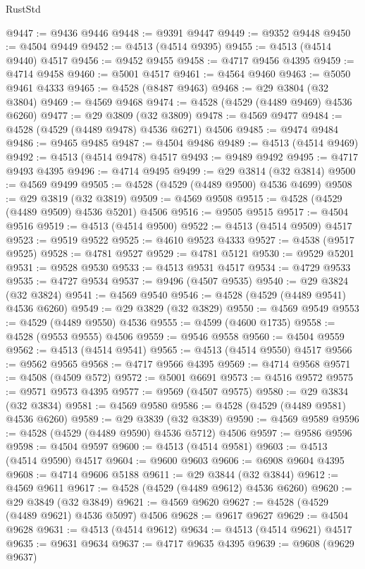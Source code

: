 \begin{lexlean}{RustStd}
\begin{coremodule}
@9447 := @9436 @9446
@9448 := @9391 @9447
@9449 := @9352 @9448
@9450 := @4504 @9449
@9452 := @4513 (@4514 @9395)
@9455 := @4513 (@4514 @9440) @4517
@9456 := @9452 @9455
@9458 := @4717 @9456 @4395
@9459 := @4714 @9458
@9460 := @5001 @4517
@9461 := @4564 @9460
@9463 := @5050 @9461 @4333
@9465 := @4528 (@8487 @9463)
@9468 := @29 @3804 (@32 @3804)
@9469 := @4569 @9468
@9474 := @4528 (@4529 (@4489 @9469) @4536 @6260)
@9477 := @29 @3809 (@32 @3809)
@9478 := @4569 @9477
@9484 := @4528 (@4529 (@4489 @9478) @4536 @6271) @4506
@9485 := @9474 @9484
@9486 := @9465 @9485
@9487 := @4504 @9486
@9489 := @4513 (@4514 @9469)
@9492 := @4513 (@4514 @9478) @4517
@9493 := @9489 @9492
@9495 := @4717 @9493 @4395
@9496 := @4714 @9495
@9499 := @29 @3814 (@32 @3814)
@9500 := @4569 @9499
@9505 := @4528 (@4529 (@4489 @9500) @4536 @4699)
@9508 := @29 @3819 (@32 @3819)
@9509 := @4569 @9508
@9515 := @4528 (@4529 (@4489 @9509) @4536 @5201) @4506
@9516 := @9505 @9515
@9517 := @4504 @9516
@9519 := @4513 (@4514 @9500)
@9522 := @4513 (@4514 @9509) @4517
@9523 := @9519 @9522
@9525 := @4610 @9523 @4333
@9527 := @4538 (@9517 @9525)
@9528 := @4781 @9527
@9529 := @4781 @5121
@9530 := @9529 @5201
@9531 := @9528 @9530
@9533 := @4513 @9531 @4517
@9534 := @4729 @9533
@9535 := @4727 @9534
@9537 := @9496 (@4507 @9535)
@9540 := @29 @3824 (@32 @3824)
@9541 := @4569 @9540
@9546 := @4528 (@4529 (@4489 @9541) @4536 @6260)
@9549 := @29 @3829 (@32 @3829)
@9550 := @4569 @9549
@9553 := @4529 (@4489 @9550) @4536
@9555 := @4599 (@4600 @1735)
@9558 := @4528 (@9553 @9555) @4506
@9559 := @9546 @9558
@9560 := @4504 @9559
@9562 := @4513 (@4514 @9541)
@9565 := @4513 (@4514 @9550) @4517
@9566 := @9562 @9565
@9568 := @4717 @9566 @4395
@9569 := @4714 @9568
@9571 := @4508 (@4509 @572)
@9572 := @5001 @6691
@9573 := @4516 @9572
@9575 := @9571 @9573 @4395
@9577 := @9569 (@4507 @9575)
@9580 := @29 @3834 (@32 @3834)
@9581 := @4569 @9580
@9586 := @4528 (@4529 (@4489 @9581) @4536 @6260)
@9589 := @29 @3839 (@32 @3839)
@9590 := @4569 @9589
@9596 := @4528 (@4529 (@4489 @9590) @4536 @5712) @4506
@9597 := @9586 @9596
@9598 := @4504 @9597
@9600 := @4513 (@4514 @9581)
@9603 := @4513 (@4514 @9590) @4517
@9604 := @9600 @9603
@9606 := @6908 @9604 @4395
@9608 := @4714 @9606 @5188
@9611 := @29 @3844 (@32 @3844)
@9612 := @4569 @9611
@9617 := @4528 (@4529 (@4489 @9612) @4536 @6260)
@9620 := @29 @3849 (@32 @3849)
@9621 := @4569 @9620
@9627 := @4528 (@4529 (@4489 @9621) @4536 @5097) @4506
@9628 := @9617 @9627
@9629 := @4504 @9628
@9631 := @4513 (@4514 @9612)
@9634 := @4513 (@4514 @9621) @4517
@9635 := @9631 @9634
@9637 := @4717 @9635 @4395
@9639 := @9608 (@9629 @9637)

\end{coremodule}
\end{lexlean}
